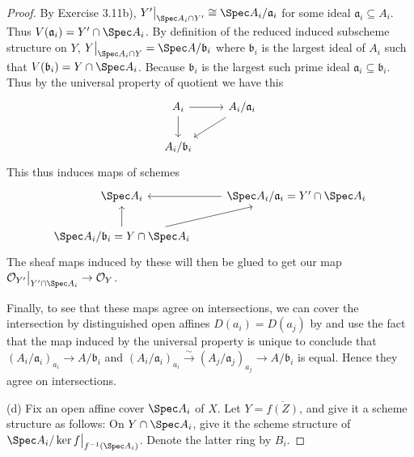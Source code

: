 \begin{proof}
	By Exercise 3.11b), $Y'\big|_{\Spec A_i\cap Y'} \cong \Spec A_i / \mathfrak{a}_i $ for some ideal $\mathfrak{a}_i \subseteq A_i$.
	Thus $V(\mathfrak{a}_i) = Y'\cap \Spec A_i $.
	By definition of the reduced induced subscheme structure on $Y $, $Y\big|_{\Spec A_i \cap Y} = \Spec A / \mathfrak{b}_i$ where $\mathfrak{b}_i $ is the largest ideal of $A_i $ such that $V(\mathfrak{b}_i) = Y\cap \Spec A_i $.
	Because $\mathfrak{b}_i $ is the largest such prime ideal $\mathfrak{a}_i \subseteq \mathfrak{b}_i $.
	Thus by the universal property of quotient we have this
	\[\begin{tikzcd}
		{A_i} & {A_i / \mathfrak{a}_i} \\
		{A_i /\mathfrak{b}_i}
		\arrow[from=1-1, to=1-2]
		\arrow[from=1-1, to=2-1]
		\arrow[from=1-2, to=2-1]
	\end{tikzcd}\]
	This thus induces maps of schemes
	\[
		\begin{tikzcd}
			{\Spec A_i} & {\Spec A_i / \mathfrak{a}_i} = Y' \cap \Spec A_i\\
			{\Spec A_i /\mathfrak{b}_i} = Y \cap \Spec A_i
			\arrow[from=1-2, to=1-1]
			\arrow[from=2-1, to=1-1]
			\arrow[from=2-1, to=1-2]
		\end{tikzcd}
	\]
	The sheaf maps induced by these will then be glued to get our map $\mathcal{O}_{Y'}\big|_{Y'\cap \Spec A_i}\to \mathcal{O}_Y $.

	Finally, to see that these maps agree on intersections, we can cover the intersection by distinguished open affines $D(a_i) = D(a_j) $ by  and use the fact that the map induced by the universal property is unique to conclude that $(A_i / \mathfrak{a}_i)_{a_i} \to A / \mathfrak{b}_i$ and $(A_i / \mathfrak{a}_i)_{a_i} \xrightarrow{\sim} (A_j / \mathfrak{a}_j)_{a_j} \to A / \mathfrak{b}_i$ is equal.
	Hence they agree on intersections.

	(d) 
	Fix an open affine cover $\Spec A_i $ of $X $.
	Let $Y = \overline{f(Z)}  $, and give it a scheme structure as follows:
	On $Y \cap \Spec A_i $, give it the scheme structure of $\Spec A_i / \ker f\big|_{f^{-1}(\Spec A_i)} $.
	Denote the latter ring by $B_i $.


\end{proof}
